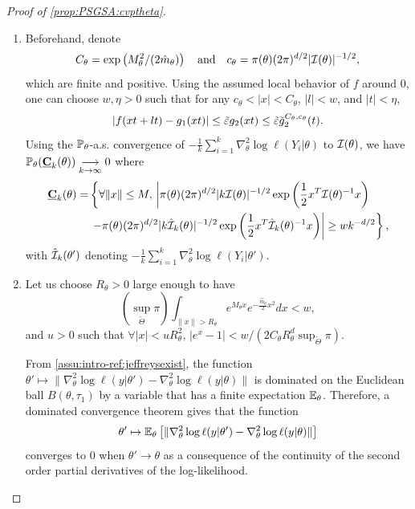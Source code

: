 \begin{proof}[Proof of \cref{prop:PSGSA:cvptheta}]
\begin{enumerate}
    \item Beforehand, denote
    \begin{equation}
        C_\theta =\exp\left(M_\theta^2/(2\hat m_\theta)\right) \quad\text{and}\quad  c_\theta = \pi(\theta)(2\pi)^{d/2}|\mathcal{I}(\theta)|^{-1/2} ,
    \end{equation}
    which are finite and positive. Using the assumed local behavior of $f$ around $0$, one can choose $ w,\eta>0$ such that for any $c_\theta<|x|<C_\theta$, $|l|< w$, and $|t|<\eta$, 
    \begin{equation}\label{eq:PSGSA:asymptdevf}
        |f(xt+lt)-g_1(xt)|\leq\tilde{\varepsilon} g_2(xt)\leq\tilde{\varepsilon}\tilde g_2^{C_\theta,c_\theta}(t).    
    \end{equation}
    Using the $\mathbb{P}_\theta$-a.s. convergence of $-\frac{1}{k}\sum_{i=1}^k\nabla^2_\theta\log\ell(Y_i|\theta)$ to $\mathcal{I}(\theta)$, we have $\mathbb{P}_\theta( \underline{\mathbf{C}}_k(\theta))\overset{\ }{\underset{k\rightarrow\infty}{\longrightarrow}}0$ where
    \begin{align}
    \nonumber
         \underline{\mathbf{C}}_k(\theta) = &\left\{\forall \|x\|\leq M,\, \left|\pi(\theta)(2\pi)^{d/2}|k\mathcal{I}(\theta)|^{-1/2}\exp\left(\frac{1}{2}x^T \mathcal{I}(\theta)^{-1}x\right) \right.\right. \\
        & \left.\left. - \pi(\theta)(2\pi)^{d/2}|k\hat{\mathcal{I}}_k(\theta)|^{-1/2}\exp\left(\frac{1}{2}x^T \hat{\mathcal{I}}_k(\theta)^{-1} x\right) \right|\geq w k^{-d/2}\right\} ,
    \end{align}
    with $\hat{\mathcal{I}}_k(\theta')$ denoting $-\frac{1}{k}\sum_{i=1}^k\nabla^2_\theta\log\ell(Y_i|\theta')$.
    
    \item 
    Let us choose $R_\theta>0$ large enough to have 
    \begin{equation}\label{eq:PSGSA:majorintegralsR}
        (\sup_{\tilde\Theta}\pi ) \int_{\|x\|>R_\theta} e^{M_\theta x}e^{-\frac{\hat m_\theta}{2}x^2} dx< w ,    
    \end{equation}
and $u>0$ such that $\forall|x|<uR_\theta^2,\,|e^{x}-1|< w/(2 C_\theta R^d_\theta\sup_{\tilde\Theta}\pi )$. 

From \cref{assu:intro-ref:jeffreysexist}, the function $\theta'\mapsto\|\nabla_\theta^2\log\ell(y|\theta')-\nabla^2_\theta\log\ell(y|\theta)\|$ is dominated on the Euclidean ball $B(\theta,\tau_1)$ by a variable that has a finite expectation $\mathbb{E}_\theta$. Therefore, a dominated convergence theorem gives that the function
    \begin{equation}
        \theta'\mapsto \mathbb{E}_\theta \left[\|\nabla_\theta^2\log\ell(y|\theta')-\nabla^2_\theta\log\ell(y|\theta)\|\right]
    \end{equation}
    converges to $0$ when $\theta'\to\theta$ as a consequence of the continuity of the second order partial derivatives of the log-likelihood. 
    

\end{enumerate}
\end{proof}
